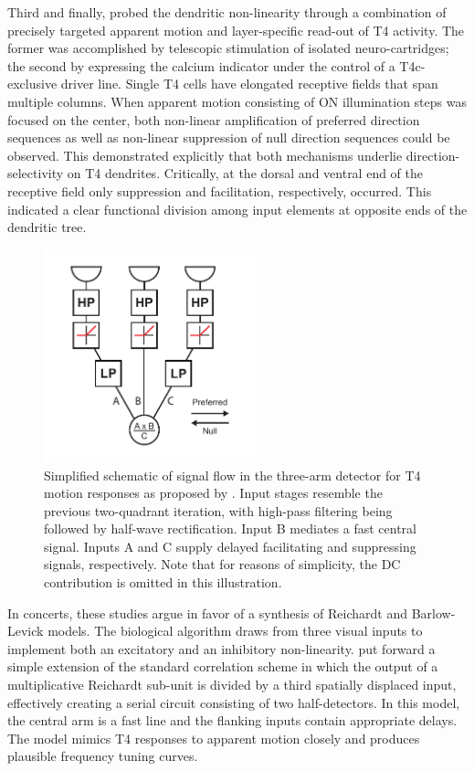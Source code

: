Third and finally, \citet{Haag:2016cq} probed the dendritic non-linearity through a combination of precisely targeted apparent motion and layer-specific read-out of T4 activity. The former was accomplished by telescopic stimulation of isolated neuro-cartridges; the second by expressing the calcium indicator under the control of a T4c-exclusive driver line. Single T4 cells have elongated receptive fields that span multiple columns. When apparent motion consisting of ON illumination steps was focused on the center, both non-linear amplification of preferred direction sequences as well as non-linear suppression of null direction sequences could be observed. This demonstrated explicitly that both mechanisms underlie direction-selectivity on T4 dendrites. Critically, at the dorsal and ventral end of the receptive field only suppression and facilitation, respectively, occurred. This indicated a clear functional division among input elements at opposite ends of the dendritic tree.

\begin{figure}
    \centering
    \includegraphics[width=0.55\textwidth]{graphics/figure_models2}
    \caption[Combining Reichardt and Barlow-Levick detectors]
    {Simplified schematic of signal flow in the three-arm detector for T4 motion responses as proposed by \citet{Haag:2016aa}. Input stages resemble the previous two-quadrant iteration, with high-pass filtering being followed by half-wave rectification. Input B mediates a fast central signal. Inputs A and C supply delayed facilitating and suppressing signals, respectively. Note that for reasons of simplicity, the DC contribution is omitted in this illustration.}
    \label{fig:detector2}
\end{figure}

In concerts, these studies argue in favor of a synthesis of Reichardt and Barlow-Levick models. The biological algorithm draws from three visual inputs to implement both an excitatory and an inhibitory non-linearity. \citet{Haag:2016cq} put forward a simple extension of the standard correlation scheme in which the output of a multiplicative Reichardt sub-unit is divided by a third spatially displaced input, effectively creating a serial circuit consisting of two half-detectors. In this model, the central arm is a fast line and the flanking inputs contain appropriate delays. The model mimics T4 responses to apparent motion closely and produces plausible frequency tuning curves.

